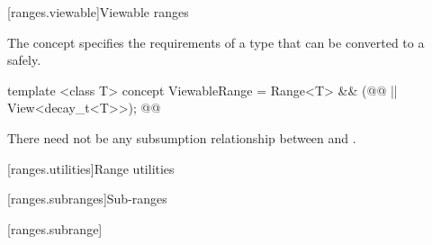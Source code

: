 \setcounter{subsection}{10}
[ranges.viewable]{Viewable ranges}

\pnum The  concept specifies the requirements of a 
type that can be converted to a  safely.

\begin{codeblock}
template <class T>
concept ViewableRange =
  Range<T> && (@@ || View<decay_t<T>>); @\removed{// \seebelow}@
\end{codeblock}

\begin{removedblock}
\pnum
There need not be any subsumption relationship between 
and .
\end{removedblock}

\setcounter{section}{7}
[ranges.utilities]{Range utilities}

\setcounter{subsection}{2}
[ranges.subranges]{Sub-ranges}

[ranges.subrange]{}

